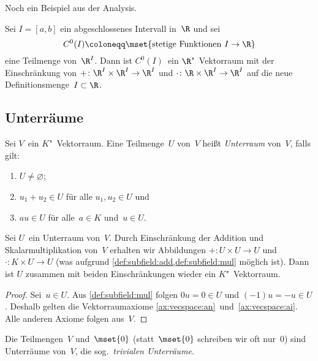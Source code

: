 \documentclass[a4paper]{article}
\begin{document}
Noch ein Beispiel aus der Analysis.

\begin{example}
    Sei $I = [a,b]$ ein abgeschlossenes Intervall in~$\R$ und sei
    \begin{equation*}
        C^0(I) \coloneqq \mset{\text{stetige Funktionen } I \to \R}
    \end{equation*}
    eine Teilmenge von~$\R^I$. Dann ist $C^0(I)$~ein $\R$"~Vektorraum mit der Einschränkung von $+\colon \R^I\times\R^I \to \R^I$ und $\cdot\colon \R\times\R^I \to \R^I$ auf die neue Definitionsmenge~$I \subset \R$.
\end{example}


\subsection{Unterräume}

\begin{definition}
    Sei $V$~ein $K$"~Vektorraum. Eine Teilmenge~$U$ von~$V$ heißt \emph{Unterraum} von~$V$, falls gilt:
    \begin{enumerate}
        \item $U \neq \varnothing$;
        \item $u_1+u_2 \in U$ für alle $u_1,u_2 \in U$ und\label{def:subspace:add}
        \item $au \in U$ für alle~$a \in K$ und~$u \in U$.\label{def:subspace:mul}
    \end{enumerate}
\end{definition}

\begin{lemma}
    Sei $U$~ein Unterraum von~$V$. Durch Einschränkung der Addition und Skalarmultiplikation von~$V$ erhalten wir Abbildungen $+\colon U\times U \to U$ und $\cdot\colon K\times U \to U$ (was aufgrund \cref{def:subfield:add,def:subfield:mul} möglich ist). Dann ist $U$ zusammen mit beiden Einschränkungen wieder ein $K$"~Vektorraum.
\end{lemma}

\begin{proof}
    Sei~$u \in U$. Aus \cref{def:subfield:mul} folgen $0u = 0 \in U$ und $(-1)u = -u \in U$. Deshalb gelten die Vektorraumaxiome \ref{ax:vecspace:an}~und~\ref{ax:vecspace:ai}. Alle anderen Axiome folgen aus~$V$.
\end{proof}

\begin{example}
    Die Teilmengen~$V$ und~$\mset{0}$ (statt~$\mset{0}$ schreiben wir oft nur~0) sind Unterräume von~$V$, die sog.\ \emph{trivialen Unterräume}.
\end{example}
\end{document}
